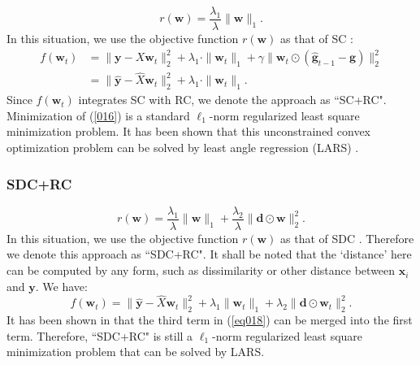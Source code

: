 \documentclass[journal]{IEEEtran}
\begin{document}
  
  \begin{equation}
 r(\textbf{w})=\frac{\lambda_1}{\lambda}\|\textbf{w}\|_1.
 \end{equation} 
 In this situation, we use the objective function $r(\textbf{w})$ as that of SC \cite{sparsecoding}: 
 \begin{align}
  f(\textbf{w}_t)&= \|\textbf{y}-X\textbf{w}_t\|^2_2+  \lambda_1 \cdot \|\textbf{w}_t\|_1 +\gamma    \|\textbf{w}_t\odot (\hat{\textbf{g}}_{t-1} -\textbf{g})  \|_2^2\nonumber \\
  &=\|\hat{\textbf{y}}-\hat{X}\textbf{w}_t\|^2_2+\lambda_1\cdot \|\textbf{w}_t\|_1. \label{016}
  \end{align}
 Since $f(\textbf{w}_t)$ integrates SC with RC, we denote the  approach as ``SC+RC".
 Minimization of (\ref{016}) is a standard $\ell_1$-norm regularized least square minimization problem.
It has been shown that this
unconstrained convex optimization problem can be solved by least
angle regression (LARS) \cite{lars2004}.

  \subsubsection{SDC+RC}
  	
  \begin{equation}
 r(\textbf{w})=\frac{\lambda_1}{\lambda}\|\textbf{w}\|_1+\frac{\lambda_2}{\lambda}\| \textbf{d}\odot \textbf{w}\|_2^2.
  \end{equation}
  In this situation, we use the objective function $r(\textbf{w})$ as that of 	SDC \cite{CJ15}. Therefore we denote this approach as ``SDC+RC".
   It shall be noted that the   `distance' here can be computed by any form, such as dissimilarity or other distance between  $\textbf{x}_i$  and $\textbf{y}$.  We have:
   \begin{equation} f(\textbf{w}_t)=\|\hat{\textbf{y}}-\hat{X}\textbf{w}_t\|^2_2+ \lambda_1 \|\textbf{w}_t\|_1+ \lambda_2\| \textbf{d}\odot \textbf{w}_t\|_2^2. \label{eq018}
  \end{equation} 
    It has been shown in  \cite{CJ15} that the third term in (\ref{eq018}) can be merged into the first term. Therefore,  ``SDC+RC"  is still a $\ell_1$-norm regularized least square minimization problem that can be solved by LARS. 
\end{document}
